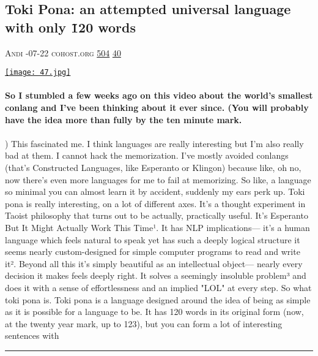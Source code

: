 \documentclass[10pt,a4paper]{article}
\begin{document}
\begin{multicols}{2}

\noindent\begin{minipage}{\linewidth}
\subsection{Toki Pona: an attempted universal language with only \~120 words}
\textsc{\footnotesize
{\scriptsize\faUser}\space 
Andi 
{\scriptsize\faCalendar}-07-22 
{\scriptsize\faGlobe}\space 
cohost.org 
{\scriptsize\faThumbsOUp}\space 
\href{http://news.ycombinator.com/item?id=37113307\&utm\_term=comment}{504} 
{\scriptsize\faComments}\space 
\href{http://news.ycombinator.com/item?id=37113307\&utm\_term=comment}{40} 
}
\par\medskip\noindent
\href{https://cohost.org/mcc/post/59045-mi-kama-sona-e-toki?utm\_source=hackernewsletter\&utm\_medium=email\&utm\_term=learn}{
    \texttt{[image: 47.jpg]}
}
\end{minipage}
\paragraph{}
\textbf{So I stumbled a few weeks ago on this video about the world's smallest conlang and I've been thinking about it ever since.
(You will probably have the idea more than fully by the ten minute mark.}
\paragraph{}
)
This fascinated me. I think languages are really interesting but I'm also really bad at them. I cannot hack the memorization. I've mostly avoided conlangs (that's Constructed Languages, like Esperanto or Klingon) because like, oh no, now there's even more languages for me to fail at memorizing. So like, a language so minimal you can almost learn it by accident, suddenly my ears perk up.
Toki pona is really interesting, on a lot of different axes. It's a thought experiment in Taoist philosophy that turns out to be actually, practically useful. It's Esperanto But It Might Actually Work This Time¹. It has NLP implications— it's a human language which feels natural to speak yet has such a deeply logical structure it seems nearly custom-designed for simple computer programs to read and write it². Beyond all this it's simply beautiful as an intellectual object— nearly every decision it makes feels deeply right. It solves a seemingly insoluble problem³ and does it with a sense of effortlessness and an implied "LOL" at every step.
So what toki pona is. Toki pona is a language designed around the idea of being as simple as it is possible for a language to be. It has 120 words in its original form (now, at the twenty year mark, up to 123), but you can form a lot of interesting sentences with 
\par\noindent\textcolor{red}{\rule{\linewidth}{0.2mm}}
\vfill
\null
\noindent\begin{minipage}{\linewidth}

\end{minipage}
\end{multicols}
\end{document}
